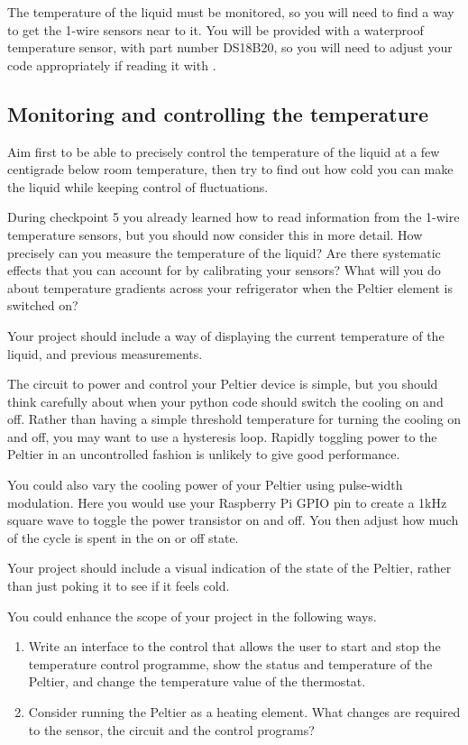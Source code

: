 The temperature of the liquid must be monitored, so you will need to find a way to get the 1-wire sensors near to it. You will be provided with a waterproof temperature sensor, with part number DS18B20, so you will need to adjust your code appropriately if reading it with \webiopi.

\subsection{Monitoring and controlling the temperature}

Aim first to be able to precisely control the temperature of the liquid at a few centigrade below room temperature, then try to find out how cold you can make the liquid while keeping control of fluctuations.


During checkpoint 5 you already learned how to read information from the 1-wire temperature sensors, but you should now consider this in more detail. How precisely can you measure the temperature of the liquid? Are there systematic effects that you can account for by calibrating your sensors? What will you do about temperature gradients across your refrigerator when the Peltier element is switched on?

Your project should include a way of displaying the current temperature of the liquid, and previous measurements.

The circuit to power and control your Peltier device is simple, but you should think carefully about when your python code should switch the cooling on and off. Rather than having a simple threshold temperature for turning the cooling on and off, you may want to use a hysteresis loop. Rapidly toggling power to the Peltier in an uncontrolled fashion is unlikely to give good performance.


You could also vary the cooling power of your Peltier using pulse-width modulation. Here you would use your Raspberry Pi GPIO pin to create a 1kHz square wave to toggle the power transistor on and off. You then adjust how much of the cycle is spent in the on or off state.


Your project should include a visual indication of the state of the Peltier, rather than just poking it to see if it feels cold. 


You could enhance the scope of your project in the following ways.
\begin{enumerate}
\item Write an interface to the control that allows the user to start and stop the temperature control programme, show the status and temperature of the Peltier, and change the temperature value of the thermostat.
\item Consider running the Peltier as a heating element. What changes are required to the sensor, the circuit and the control programs?
\end{enumerate}

